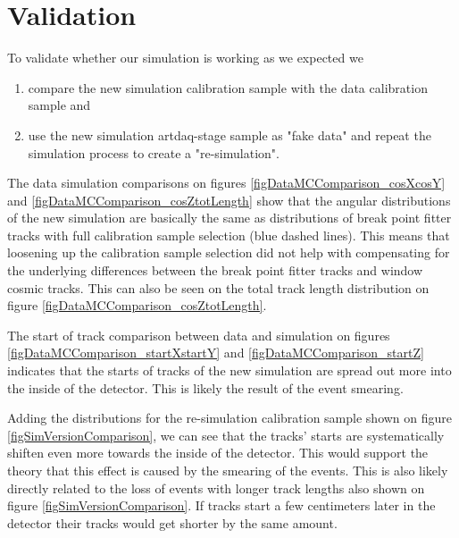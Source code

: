 \documentclass[12pt]{article}
\begin{document}
\section{Validation}
To validate whether our simulation is working as we expected we
\begin{enumerate}
\item compare the new simulation calibration sample with the data calibration sample and
\item use the new simulation artdaq-stage sample as "fake data" and repeat the simulation process to create a "re-simulation".
\end{enumerate}

The data simulation comparisons on figures \ref{figDataMCComparison_cosXcosY} and \ref{figDataMCComparison_cosZtotLength} show that the angular distributions of the new simulation are basically the same as distributions of break point fitter tracks with full calibration sample selection (blue dashed lines). This means that loosening up the calibration sample selection did not help with compensating for the underlying differences between the break point fitter tracks and window cosmic tracks. This can also be seen on the total track length distribution on figure \ref{figDataMCComparison_cosZtotLength}.

The start of track comparison between data and simulation on figures \ref{figDataMCComparison_startXstartY} and \ref{figDataMCComparison_startZ} indicates that the starts of tracks of the new simulation are spread out more into the inside of the detector. This is likely the result of the event smearing.

Adding the distributions for the re-simulation calibration sample shown on figure \ref{figSimVersionComparison}, we can see that the tracks' starts are systematically shiften even more towards the inside of the detector. This would support the theory that this effect is caused by the smearing of the events. This is also likely directly related to the loss of events with longer track lengths also shown on figure \ref{figSimVersionComparison}. If tracks start a few centimeters later in the detector their tracks would get shorter by the same amount.
\end{document}
